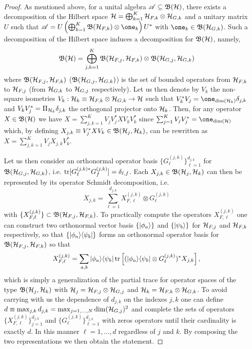 \documentclass[aihp,12pt]{imsart}
\begin{document}
\begin{proof}
As mentioned above, for a unital algebra $\mathscr{A}\subseteq\mathfrak{B}(\mathcal{H})$, there exists a decomposition of the Hilbert space $\mathcal{H} = \bigoplus_{k=1}^K \mathcal{H}_{F,k} \otimes \mathcal{H}_{G,k}$ and a unitary matrix $U$ such that $\As = U\left(\bigoplus_{k=1}^K \Bf(\Hc_{F,k})\otimes \one_k\right)U^*$ with $\one_k\in\Bf(\Hc_{G,k})$. Such a decomposition of the Hilbert space induces a decomposition for $\mathfrak{B}(\mathcal{H})$, namely, \[\mathfrak{B}(\mathcal{H}) = \bigoplus_{j,k=1}^K \mathfrak{B}(\mathcal{H}_{F,j},\mathcal{H}_{F,k})\otimes\mathfrak{B}(\mathcal{H}_{G,j},\mathcal{H}_{G,k}) \]
where $\mathfrak{B}(\mathcal{H}_{F,j},\mathcal{H}_{F,k})$ ($\mathfrak{B}(\mathcal{H}_{G,j},\mathcal{H}_{G,k})$) is the set of bounded operators from $\mathcal{H}_{F,k}$ to $\mathcal{H}_{F,j}$ (from $\mathcal{H}_{G,k}$ to $\mathcal{H}_{G,j}$ respectively).
Let us then denote by $V_k$ the non-square isometries $V_k:\mathcal{H}_k\equiv\mathcal{H}_{F,k}\otimes\mathcal{H}_{G,k}\to \mathcal{H}$ such that $V_k^* V_j = \one_{\dim(\Hc_k)} \delta_{j,k}$ and $V_kV_j^* = \Pi_{\mathcal{H}_k}\delta_{j,k}$ the orthogonal projector onto $\mathcal{H}_k$. Then, for any operator $X\in\mathfrak{B}(\mathcal{H})$ we have $X = \sum_{j,k=1}^K V_jV_j^* X V_kV_k^*$ since $\sum_{j=1}^K V_jV_j^* = \one_{\dim(\Hc)}$ which, by defining $X_{j,k} \equiv V_j^* X V_k \in\mathfrak{B}(\mathcal{H}_j,\mathcal{H}_k)$, can be rewritten as $X = \sum_{j,k=1}^K V_j X_{j,k} V_k^*$. 

Let us then consider an orthonormal operator basis $\{G_{\ell}^{(j,k)}\}_{\ell=1}^{d_{j,k}}$ for $\mathfrak{B}(\mathcal{H}_{G,j},\mathcal{H}_{G,k})$, i.e. ${\rm tr}[G_\ell^{(j,k)*} G_f^{(j,k)}] = \delta_{\ell,f}$.  
Each $X_{j,k}\in\mathfrak{B}(\mathcal{H}_j,\mathcal{H}_k)$ can then be represented by its operator Schmidt decomposition, i.e. \[X_{j,k} = \sum_{\ell=1}^{d_{j,k}} X_{F,\ell}^{(j,k)}\otimes G_{\ell}^{(j,k)}\] with $\{X_{F,\ell}^{(j,k)}\}\subset\mathfrak{B}(\mathcal{H}_{F,j},\mathcal{H}_{F,k})$.
To practically compute the operators $X_{F,\ell}^{(j,k)}$ one can construct two orthonormal vector basis $\{\left| \phi_a \right>\}$ and $\{\left| \psi_b \right>\}$ for $\mathcal{H}_{F,j}$ and $\mathcal{H}_{F,k}$ respectively, so that $\{\left\vert \phi_a \middle>\middle< \psi_b \right\vert\}$ forms an orthonormal operator basis for $\mathfrak{B}(\mathcal{H}_{F,j}, \mathcal{H}_{F,k})$ so that \[X_{F,\ell}^{(j,k)} = \sum_{a,b} \left\vert \phi_a \middle>\middle< \psi_b \right\vert {\rm tr}\left[(\left\vert \phi_a \middle>\middle< \psi_b \right\vert\otimes G_\ell^{(j,k)})^* X_{j,k} \right],\] which is simply a generalization of the partial trace for operator spaces of the type $\mathfrak{B}(\mathcal{H}_j,\mathcal{H}_k)$ with $\mathcal{H}_{j} = \mathcal{H}_{F,j}\otimes\mathcal{H}_{G,j}$ and $\mathcal{H}_k=\mathcal{H}_{F,k}\otimes\mathcal{H}_{G,k}$. To avoid carrying with us the dependence of $d_{j,k}$ on the indexes $j,k$ one can define $d\equiv \max_{j,k} d_{j,k} = \max_{j=1,\dots,N}\dim(\mathcal{H}_{G,j})^2$ and complete the sets of operators $\{X_{F,\ell}^{(j,k)}\}_{j=1}^{d_{j,k}}$ and $\{G_\ell^{(j,k)}\}_{\ell=1}^{d_{j,k}}$ with zeros operators until their cardinality is exactly $d$. In this manner $\ell=1,\dots,d$ regardless of $j$ and $k$.
By composing the two representations we then obtain the statement. 
\end{proof}
\end{document}
